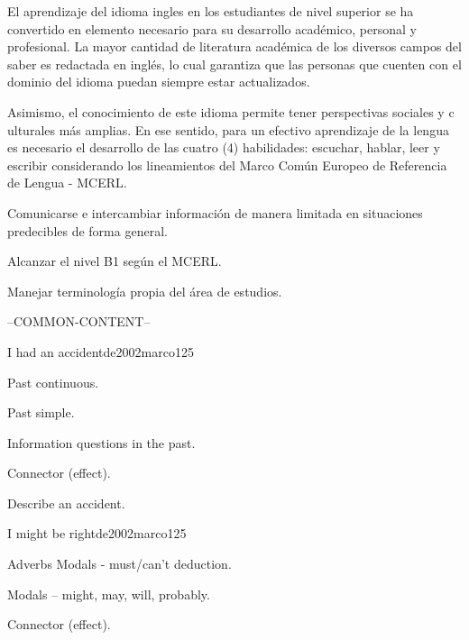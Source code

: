 \begin{syllabus}


\begin{justification}
El aprendizaje del idioma ingles en los estudiantes de nivel superior se ha 
convertido en elemento necesario para su desarrollo académico, personal y 
profesional. La mayor cantidad de literatura académica de los diversos campos 
del saber es redactada en inglés, lo cual garantiza que las personas que cuenten 
con el dominio del idioma puedan siempre estar actualizados. 

Asimismo, el conocimiento de este idioma permite tener perspectivas sociales y c
ulturales más amplias. En ese sentido, para un efectivo aprendizaje de la 
lengua es necesario el desarrollo de las cuatro (4) habilidades: 
escuchar, hablar, leer y escribir considerando los lineamientos del 
Marco Común Europeo de Referencia de Lengua - MCERL.
\end{justification}

\begin{goals}
\item Comunicarse e intercambiar información de manera limitada en situaciones predecibles de forma general.
\item Alcanzar el nivel B1 según el MCERL.
\item Manejar terminología propia del área de estudios.
\end{goals}

--COMMON-CONTENT--

\begin{unit}{I had an accident}{}{de2002marco}{12}{5}
   \begin{topics}
      \item Past continuous.
      \item Past simple.
      \item Information questions in the past.
      \item Connector (effect).
   \end{topics}

   \begin{learningoutcomes}
      \item Describe an accident.
   \end{learningoutcomes}
\end{unit}

\begin{unit}{I might be right}{}{de2002marco}{12}{5}
   \begin{topics}
      \item Adverbs Modals - must/can’t deduction.
      \item Modals – might, may, will, probably.
      \item Connector (effect).
   \end{topics}


\end{unit}
\end{syllabus}
